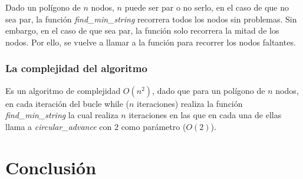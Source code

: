 \documentclass[a4paper, 11pt]{article}
\begin{document}
	Dado un polígono de $n$ nodos, $n$ puede ser par o no serlo, en el caso de que no sea par, la función \textit{find\_min\_string} recorrera todos los nodos sin problemas. Sin embargo, en el caso de que sea par, la función solo recorrera la mitad de los nodos.
	Por ello, se vuelve a llamar a la función para recorrer los nodos faltantes.

\subsubsection{La complejidad del algoritmo}
Es un algoritmo de complejidad $O(n^2)$, dado que para un polígono de $n$ nodos, en cada iteración del bucle while ($n$ iteraciones) realiza la función \textit{find\_min\_string} la cual realiza $n$ iteraciones en las que en cada una de ellas llama a \textit{circular\_advance} con $2$ como parámetro ($O(2)$).


\section{Conclusión}
\end{document}
